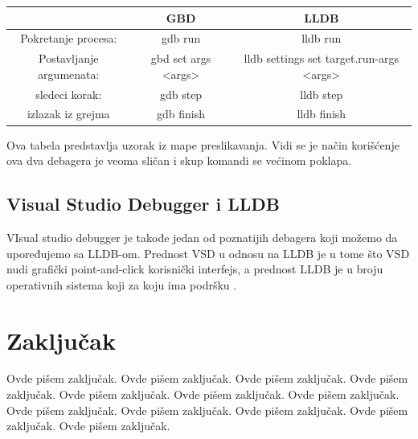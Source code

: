 \documentclass[a4paper]{article}
\begin{document}
\begin{center}
	\begin{tabular}{c | c | c}
		 & GBD & LLDB \\ 
		\hline
		Pokretanje procesa: & gdb run & lldb run \\ 
		\hline 
		Postavljanje argumenata: & gbd set args <args>
		 & lldb settings set target.run-args <args> \\
		 \hline
		sledeci korak: & gdb step & lldb step \\
		\hline
		izlazak iz grejma & gdb finish & lldb finish
	\end{tabular}
\end{center}

\indent Ova tabela predstavlja uzorak iz mape preslikavanja. Vidi se je način korišćenje ova dva debagera je veoma sličan i skup komandi se većinom poklapa. 

\subsection{Visual Studio Debugger i LLDB}
\label{subsec: Visual Studio Debugger i LLDB}

VIsual studio debugger je takođe jedan od poznatijih debagera koji možemo da upoređujemo sa LLDB-om. Prednost VSD u odnosu na LLDB je u tome što VSD nudi grafički point-and-click korisnički interfejs, a prednost LLDB je u broju operativnih sistema koji za koju ima podršku \cite{vsd}.

\section{Zaključak}
\label{sec:zakljucak}

Ovde pišem zaključak. 
Ovde pišem zaključak. 
Ovde pišem zaključak. 
Ovde pišem zaključak. 
Ovde pišem zaključak. 
Ovde pišem zaključak. 
Ovde pišem zaključak. 
Ovde pišem zaključak. 
Ovde pišem zaključak. 
Ovde pišem zaključak. 
Ovde pišem zaključak. 
Ovde pišem zaključak. 


\appendix
 

\end{document}
